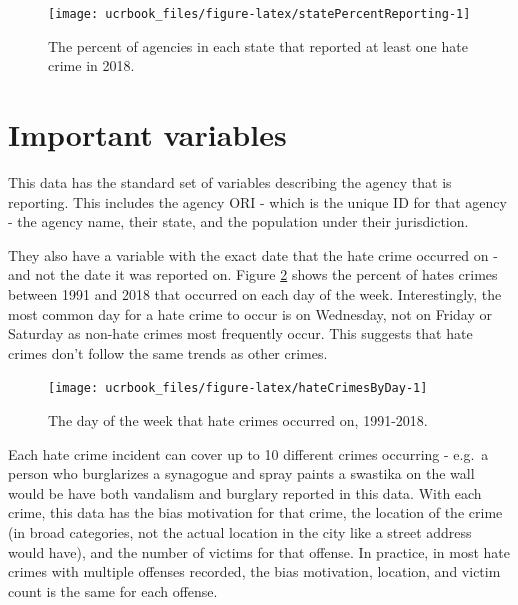 \documentclass[
  12pt,
  openany]{book}
\begin{document}
\begin{figure}

{\centering \texttt{[image: ucrbook\_files/figure-latex/statePercentReporting-1]} 

}

\caption{The percent of agencies in each state that reported at least one hate crime in 2018.}\label{fig:statePercentReporting}
\end{figure}

\hypertarget{important-variables-3}{%
\section{Important variables}\label{important-variables-3}}

This data has the standard set of variables describing the agency that is reporting. This includes the agency ORI - which is the unique ID for that agency - the agency name, their state, and the population under their jurisdiction.

They also have a variable with the exact date that the hate crime occurred on - and not the date it was reported on. Figure \ref{fig:hateCrimesByDay} shows the percent of hates crimes between 1991 and 2018 that occurred on each day of the week. Interestingly, the most common day for a hate crime to occur is on Wednesday, not on Friday or Saturday as non-hate crimes most frequently occur. This suggests that hate crimes don't follow the same trends as other crimes.

\begin{figure}

{\centering \texttt{[image: ucrbook\_files/figure-latex/hateCrimesByDay-1]} 

}

\caption{The day of the week that hate crimes occurred on, 1991-2018.}\label{fig:hateCrimesByDay}
\end{figure}

Each hate crime incident can cover up to 10 different crimes occurring - e.g.~a person who burglarizes a synagogue and spray paints a swastika on the wall would be have both vandalism and burglary reported in this data. With each crime, this data has the bias motivation for that crime, the location of the crime (in broad categories, not the actual location in the city like a street address would have), and the number of victims for that offense. In practice, in most hate crimes with multiple offenses recorded, the bias motivation, location, and victim count is the same for each offense.
\end{document}
